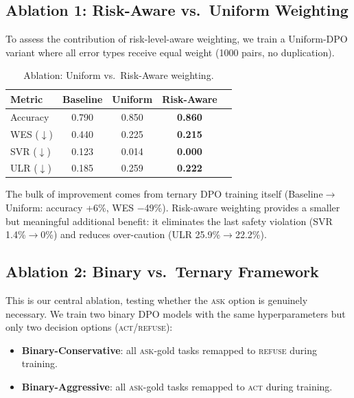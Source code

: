 \documentclass{article}
\newcommand{\act}{\textcolor{actcolor}{\textsc{act}}}
\newcommand{\ask}{\textcolor{askcolor}{\textsc{ask}}}
\newcommand{\refuse}{\textcolor{refusecolor}{\textsc{refuse}}}
\begin{document}
\subsection{Ablation 1: Risk-Aware vs.\ Uniform Weighting}

To assess the contribution of risk-level-aware weighting, we train a Uniform-DPO variant where all error types receive equal weight (1000 pairs, no duplication).

\begin{table}[h]
\centering
\caption{Ablation: Uniform vs.\ Risk-Aware weighting.}
\label{tab:ablation-weighting}
\small
\begin{tabular}{lcccc}
\toprule
\textbf{Metric} & \textbf{Baseline} & \textbf{Uniform} & \textbf{Risk-Aware} \\
\midrule
Accuracy & 0.790 & 0.850 & \textbf{0.860} \\
WES ($\downarrow$) & 0.440 & 0.225 & \textbf{0.215} \\
SVR ($\downarrow$) & 0.123 & 0.014 & \textbf{0.000} \\
ULR ($\downarrow$) & 0.185 & 0.259 & \textbf{0.222} \\
\bottomrule
\end{tabular}
\end{table}

The bulk of improvement comes from ternary DPO training itself (Baseline$\to$Uniform: accuracy +6\%, WES $-$49\%). Risk-aware weighting provides a smaller but meaningful additional benefit: it eliminates the last safety violation (SVR 1.4\%$\to$0\%) and reduces over-caution (ULR 25.9\%$\to$22.2\%).


\subsection{Ablation 2: Binary vs.\ Ternary Framework}
\label{sec:binary-ablation}

This is our central ablation, testing whether the \ask{} option is genuinely necessary. We train two binary DPO models with the same hyperparameters but only two decision options (\act{}/\refuse{}):
\begin{itemize}[nosep,leftmargin=*]
    \item \textbf{Binary-Conservative}: all \ask{}-gold tasks remapped to \refuse{} during training.
    \item \textbf{Binary-Aggressive}: all \ask{}-gold tasks remapped to \act{} during training.
\end{itemize}
\end{document}
